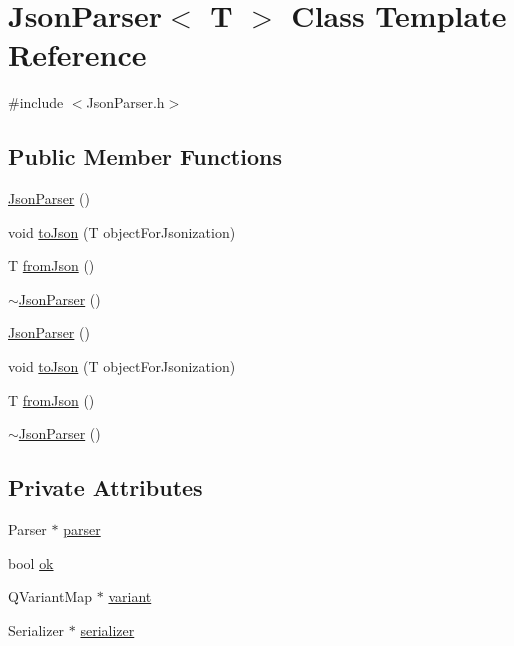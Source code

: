 \hypertarget{class_json_parser}{\section{Json\-Parser$<$ T $>$ Class Template Reference}
\label{class_json_parser}
}


{\ttfamily \#include $<$Json\-Parser.\-h$>$}

\subsection*{Public Member Functions}
\begin{DoxyCompactItemize}
\item 
\hyperlink{class_json_parser_a8ad3e29e7a7834cc8e24b00c229f1590}{Json\-Parser} ()
\item 
void \hyperlink{class_json_parser_a2b1d7b2fb0845a0629227171f337ef38}{to\-Json} (T object\-For\-Jsonization)
\item 
T \hyperlink{class_json_parser_a7b15f7aa9fb5d417386673d82247ecbc}{from\-Json} ()
\item 
\hyperlink{class_json_parser_aeb7bd90e9b183346f970a3a9f9faf3b3}{$\sim$\-Json\-Parser} ()
\item 
\hyperlink{class_json_parser_a8ad3e29e7a7834cc8e24b00c229f1590}{Json\-Parser} ()
\item 
void \hyperlink{class_json_parser_a2b1d7b2fb0845a0629227171f337ef38}{to\-Json} (T object\-For\-Jsonization)
\item 
T \hyperlink{class_json_parser_a7b15f7aa9fb5d417386673d82247ecbc}{from\-Json} ()
\item 
\hyperlink{class_json_parser_aeb7bd90e9b183346f970a3a9f9faf3b3}{$\sim$\-Json\-Parser} ()
\end{DoxyCompactItemize}
\subsection*{Private Attributes}
\begin{DoxyCompactItemize}
\item 
Parser $\ast$ \hyperlink{class_json_parser_af9b00eda4e1a68574846796ada01f77e}{parser}
\item 
bool \hyperlink{class_json_parser_a5a99ccd0d3f89640413a2ea36db8857f}{ok}
\item 
Q\-Variant\-Map $\ast$ \hyperlink{class_json_parser_a967feb146cd54a4edcae6a590e8377c5}{variant}
\item 
Serializer $\ast$ \hyperlink{class_json_parser_afac8d34e08d9f482832564ae1bce061a}{serializer}
\end{DoxyCompactItemize}


